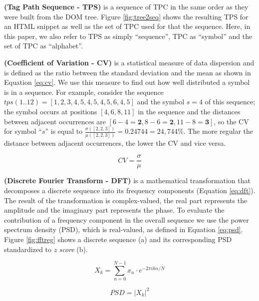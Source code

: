 \documentclass{vldb}
\begin{document}
\begin{definition}\textbf{(Tag Path Sequence - TPS)} is a sequence of TPC in the
same order as they were built from the DOM tree. Figure \ref{fig:tree2seq} shows
the resulting TPS for an HTML snippet as  well as the set of TPC used for that
the sequence. Here, in this paper, we also refer to TPS as simply ``sequence'',
TPC as ``symbol'' and the set of TPC as ``alphabet''.
\end{definition}

\begin{definition}\textbf{(Coefficient of Variation - CV)} is a statistical
measure of data dispersion and is defined as the ratio between the standard
deviation and the mean as shown in Equation \ref{eq:cv}. We use this measure to
find out how well distributed a symbol is in a sequence. For example, consider
the sequence $tps(1..12)=[1,2,3,4,5,4,5,4,5,6,4,5]$ and the symbol $s=4$ of this
sequence; the symbol occurs at positions $[4,6,8,11]$ in the sequence and the
distances between adjacent occurrences are
$[6-4=\textbf{2},8-6=\textbf{2},11-8=\textbf{3}]$, so the CV for symbol ``$s$''
is equal to $\frac{\sigma([2, 2, 3])}{\mu([2, 2, 3])}=0.24744=24,744\%$. The more
regular the distance between adjacent occurrences, the lower the CV and vice
versa.

\begin{equation}\label{eq:cv}
    CV=\frac{\sigma}{\mu}
\end{equation}
\end{definition}

\begin{definition}\textbf{(Discrete Fourier Transform - DFT)} is a mathematical
transformation that decomposes a discrete sequence into its frequency components
(Equation \ref{eq:dft}). The result of the transformation is complex-valued, the
real part represents the amplitude and the imaginary part represents the phase.
To evaluate the contribution of a frequency component in the overall sequence we
use the power spectrum density (PSD), which is real-valued, as defined in
Equation \ref{eq:psd}.
Figure \ref{fig:fftreg} shows a discrete sequence (a) and its corresponding PSD
standardized to \textit{z score} (b).

\begin{equation}\label{eq:dft}
    X_k=\sum_{n=0}^{N-1}{x_n\cdot e^{-2\pi ikn/N}}    
\end{equation}

\begin{equation}\label{eq:psd}
    PSD=|X_k|^2
\end{equation}

\end{definition}
\end{document}
